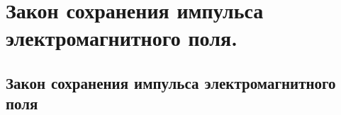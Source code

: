 \chapter{Закон сохранения импульса электромагнитного поля.}

\section{Закон сохранения импульса электромагнитного поля}
